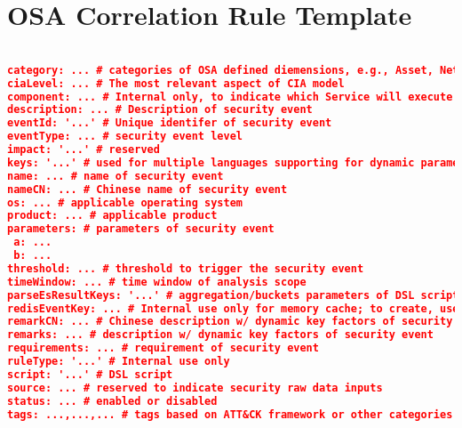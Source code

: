 
%
%

\section*{OSA Correlation Rule Template}
%
\label{appendix:osacorrelationruletemplate}

\begin{lstlisting}[language=json,firstnumber=1]

category: ... # categories of OSA defined diemensions, e.g., Asset, Network, Account, Application, Vulnerbility, Attack
ciaLevel: ... # The most relevant aspect of CIA model
component: ... # Internal only, to indicate which Service will execute the rule
description: ... # Description of security event
eventId: '...' # Unique identifer of security event
eventType: ... # security event level
impact: '...' # reserved
keys: '...' # used for multiple languages supporting for dynamic parameters within remarks.
name: ... # name of security event
nameCN: ... # Chinese name of security event
os: ... # applicable operating system 
product: ... # applicable product
parameters: # parameters of security event
 a: ...
 b: ...
threshold: ... # threshold to trigger the security event
timeWindow: ... # time window of analysis scope
parseEsResultKeys: '...' # aggregation/buckets parameters of DSL script
redisEventKey: ... # Internal use only for memory cache; to create, use the "name" field, put "event" at the beginning, all lower case, with dash in between.
remarkCN: ... # Chinese description w/ dynamic key factors of security event
remarks: ... # description w/ dynamic key factors of security event
requirements: ... # requirement of security event
ruleType: '...' # Internal use only
script: '...' # DSL script
source: ... # reserved to indicate security raw data inputs
status: ... # enabled or disabled
tags: ...,...,... # tags based on ATT&CK framework or other categories

\end{lstlisting}

\pagebreak


